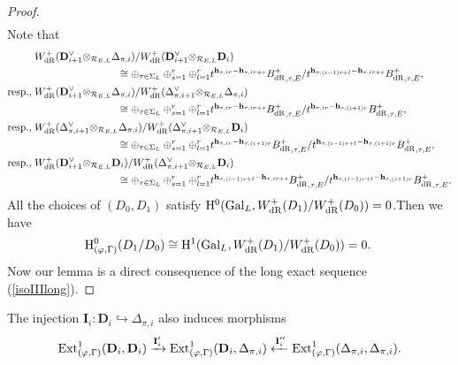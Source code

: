 \documentclass[SecEq,CM,GP]{degruyter-crelle} %
\theoremstyle{plain}
\newcommand{\bdr}{{B^+_{\mathrm{dR}}}}
\newcommand{\Dpik}{{\mathbf{D}}}
\newcommand{\ext}{{\rm Ext}}
\newcommand{\gal}{{\rm Gal}}
\newcommand{\hH}{{\mathrm{H}}}
\newcommand{\hpi}{{{\mathbf{h}}}}
\newcommand{\tee}{{{\otimes}_{\cR_{E,L}}}}
\newcommand{\wdr}{{W^+_{\mathrm{dR}}}}
\newcommand{\cR}{\mathcal R}
\begin{document}
\begin{proof}
\begin{equation}
\begin{aligned}
	\end{aligned}
\end{equation}
Note that 
\begin{equation}
	\begin{aligned}
		&\wdr(\Dpik_{i+1}^\vee\tee\Delta_{\pi,i})/\wdr(\Dpik_{i+1}^\vee\tee\Dpik_{i})\\
		&\hspace{80pt}\cong \oplus_{\tau\in \Sigma_L}\oplus_{s=1}^r\oplus_{l=1}^rt^{\hpi_{\tau,ir}-\hpi_{\tau,ir+s}}\bdr_{,\tau,E}/t^{\hpi_{\tau,(i-1)r+l}-\hpi_{\tau,ir+s}}\bdr_{,\tau,E},\\
		\text{resp.,\;}&\wdr(\Dpik_{i+1}^\vee\tee\Delta_{\pi,i})/\wdr(\Delta_{\pi,i+1}^\vee\tee\Delta_{\pi,i})\\
		&\hspace{80pt}\cong \oplus_{\tau\in \Sigma_L}\oplus_{s=1}^r\oplus_{l=1}^rt^{\hpi_{\tau,ir}-\hpi_{\tau,ir+s}}\bdr_{,\tau,E}/t^{\hpi_{\tau,ir}-\hpi_{\tau,(i+1)r}}\bdr_{,\tau,E},
		\\
		\text{resp.,\;}&		
		\wdr(\Delta_{\pi,i+1}^\vee\tee\Delta_{\pi,i})/\wdr(\Delta_{\pi,i+1}^\vee\tee\Dpik_{i})\\
		&\hspace{80pt}\cong \oplus_{\tau\in \Sigma_L}\oplus_{s=1}^r\oplus_{l=1}^rt^{\hpi_{\tau,ir}-\hpi_{\tau,(i+1)r}}\bdr_{,\tau,E}/t^{\hpi_{\tau,(i-1)r+l}-\hpi_{\tau,(i+1)r}}\bdr_{,\tau,E},\\
		\text{resp.,\;}&\wdr(\Dpik_{i+1}^\vee\tee\Dpik_{i})/\wdr(\Delta_{\pi,i+1}^\vee\tee\Dpik_{i})\\
		&\hspace{80pt}\cong \oplus_{\tau\in \Sigma_L}\oplus_{s=1}^r\oplus_{l=1}^rt^{\hpi_{\tau,(i-1)r+l}-\hpi_{\tau,ir+s}}\bdr_{,\tau,E}/t^{\hpi_{\tau,(i-1)r+l}-\hpi_{\tau,(i+1)r}}\bdr_{,\tau,E}.
	\end{aligned}
\end{equation}
All the choices of $(D_0,D_1)$ satisfy $\hH^0(\gal_L,\wdr(D_1)/\wdr(D_0))=0$.\;Then we have $$\hH^0_{(\varphi,\Gamma)}(D_1/D_0)\cong \hH^1(\gal_L,\wdr(D_1)/\wdr(D_0))=0.\;$$Now our lemma is a direct consequence of the long exact sequence (\ref{isoIIIlong}).\;
\end{proof}

The injection $\mathbf{I}_{i}:\Dpik_{i}\hookrightarrow \Delta_{\pi,i}$ also induces morphisms
\begin{equation}\label{preliminamorphism2}
\begin{aligned}
	\ext^1_{(\varphi,\Gamma)}(\Dpik_i,\Dpik_i)  \xrightarrow{\mathbf{I}_{i}'}  \ext^1_{(\varphi,\Gamma)}(\Dpik_i,\Delta_{\pi,i})  \xleftarrow{\mathbf{I}_{i}''}  \ext^1_{(\varphi,\Gamma)}(\Delta_{\pi,i},\Delta_{\pi,i}).
\end{aligned}
\end{equation}
\end{document}
